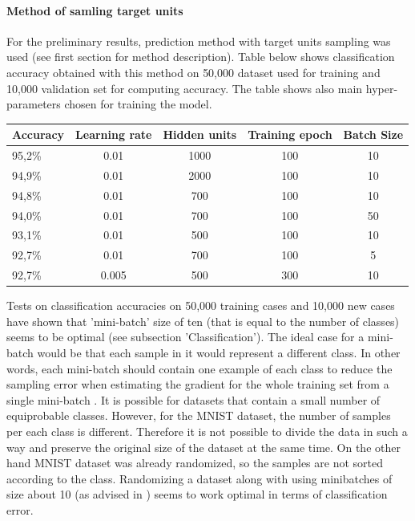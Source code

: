 \documentclass[a4paper]{scrartcl}
\begin{document}
 
\paragraph{Method of samling target units} For the preliminary results, prediction method with target units sampling was used (see first section for method description). Table below shows classification accuracy obtained with this method on 50,000 dataset used for training and 10,000 validation set for computing accuracy. The table shows also main hyper-parameters chosen for training the model.
\begin{center}
\hspace{1cm}
\begin{tabular}{|l||c|c|c|c|} \hline
Accuracy & Learning rate & Hidden units & Training epoch & Batch Size
\\ \hline
95,2\% & 0.01 & 1000 & 100 & 10
\\ \hline
94,9\% & 0.01 & 2000 & 100 & 10
\\ \hline
94,8\% & 0.01 & 700 & 100 & 10
\\ \hline
94,0\% & 0.01 & 700 & 100 & 50
\\ \hline
93,1\% & 0.01 & 500 & 100 & 10
\\ \hline
92,7\% & 0.01 & 700 & 100 & 5
\\ \hline
92,7\% & 0.005 & 500 & 300 & 10
\\ \hline \end{tabular}
\end{center}
Tests on classification accuracies on 50,000 training cases and 10,000 new cases have shown that 'mini-batch' size of ten (that is equal to the number of classes) seems to be optimal (see subsection 'Classification'). The ideal case for a mini-batch would be that each sample in it would represent a different class. In other words, each mini-batch should contain one example of each class to reduce the sampling error when estimating the gradient for the whole training set from a single mini-batch \cite{Hinton}. It is possible for datasets that contain a small number of equiprobable classes. However, for the MNIST dataset, the number of samples per each class is different. Therefore it is not possible to divide the data in such a way and preserve the original size of the dataset at the same time. On the other hand MNIST dataset was already randomized, so the samples are not sorted according to the class. Randomizing a dataset along with using minibatches of size about 10 (as advised in \cite{Hinton}) seems to work optimal in terms of classification error.
\end{document}
